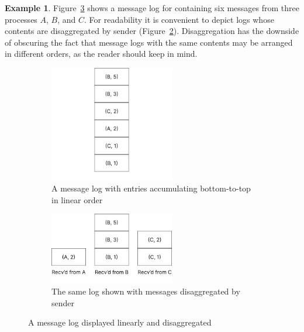 \documentclass[]             %
{NASA}                       %
\theoremstyle{definition}
\newtheorem{example}[theorem]{Example}
\begin{document}
\begin{example}
  Figure~\ref{fig:message-log} shows a message log for containing six
  messages from three processes $A$, $B$, and $C$. For readability it
  is convenient to depict logs whose contents are disaggregated by
  sender (Figure~\ref{fig:message-log-b}). Disaggregation has the
  downside of obscuring the fact that message logs with the same
  contents may be arranged in different orders, as the reader should
  keep in mind.
\end{example}

\begin{figure}
  \setlength\belowcaptionskip{5ex}
  \begin{subfigure}{1\textwidth}
    \centering
    \includegraphics[width=0.6\textwidth]{images/MessageLog1.png}
    \caption{A message log with entries accumulating bottom-to-top in linear order}
    \label{fig:message-log-a}
  \end{subfigure}
  \begin{subfigure}{1\textwidth}
    \centering
    \includegraphics[width=0.6\textwidth]{images/MessageLog2.png}
    \caption{The same log shown with messages disaggregated by sender}
    \label{fig:message-log-b}
  \end{subfigure}
  \caption{A message log displayed linearly and disaggregated}
  \label{fig:message-log}
\end{figure}
\end{document}
